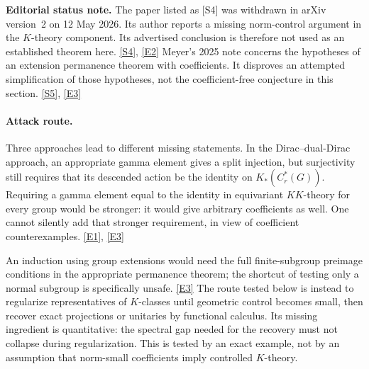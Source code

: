 \documentclass[11pt]{article}
\newcommand{\sref}[2]{\hyperlink{source:#1:#2}{[S#2]}}
\newcommand{\eref}[2]{\hyperlink{extra:#1:#2}{[E#2]}}
\begin{document}
\textbf{Editorial status note.} The paper listed as [S4] was withdrawn
in arXiv version~2 on 12 May 2026. Its author reports a missing norm-control
argument in the $K$-theory component. Its advertised conclusion is
therefore not used as an established theorem here. \sref{statement}{4},
\eref{statement}{2}
Meyer's 2025 note concerns the hypotheses of an extension permanence
theorem with coefficients. It disproves an attempted simplification of
those hypotheses, not the coefficient-free conjecture in this section.
\sref{statement}{5}, \eref{statement}{3}

\paragraph{Attack route.}
Three approaches lead to different missing statements. In the
Dirac--dual-Dirac approach, an appropriate gamma element gives a split
injection, but surjectivity still requires that its descended action be
the identity on $K_*(C_r^*(G))$. Requiring a gamma element equal to the
identity in equivariant $KK$-theory for every group would be stronger:
it would give arbitrary coefficients as well. One cannot silently add
that stronger requirement, in view of coefficient counterexamples.
\eref{statement}{1}, \eref{statement}{3}

An induction using group extensions would need the full finite-subgroup
preimage conditions in the appropriate permanence theorem; the shortcut
of testing only a normal subgroup is specifically unsafe. \eref{statement}{3}
The route tested below is instead to regularize representatives of
$K$-classes until geometric control becomes small, then recover exact
projections or unitaries by functional calculus. Its missing ingredient
is quantitative: the spectral gap needed for the recovery must not
collapse during regularization. This is tested by an exact example, not
by an assumption that norm-small coefficients imply controlled
$K$-theory.
\end{document}
